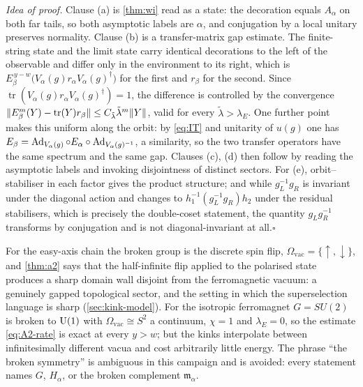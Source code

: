 \smallskip\noindent\textit{Idea of proof.}
Clause (a) is \cref{thm:wi} read as a state: the decoration equals $A_\alpha$ on
both far tails, so both asymptotic labels are $\alpha$, and conjugation by a
local unitary preserves normality.  Clause (b) is a transfer-matrix gap estimate.
The finite-string state and the limit state carry identical decorations to the
left of the observable and differ only in the environment to its right, which is
$E_\beta^{\,y-w}\bigl(V_\alpha(g)r_\alpha V_\alpha(g)^\dagger\bigr)$ for the
first and $r_\beta$ for the second.  Since
$\operatorname{tr}(V_\alpha(g)r_\alpha V_\alpha(g)^\dagger)=1$, the difference is
controlled by the convergence $\lVert E_\beta^m(Y)-\operatorname{tr}(Y)r_\beta\rVert\le
C_{\tilde\lambda}\tilde\lambda^m\lVert Y\rVert$, valid for every
$\tilde\lambda>\lambda_E$.  One further point makes this uniform along the orbit:
by \cref{eq:IT} and unitarity of $u(g)$ one has
$E_\beta=\operatorname{Ad}_{V_\alpha(g)}\circ E_\alpha\circ\operatorname{Ad}_{V_\alpha(g)^{-1}}$, a
similarity, so the two transfer operators have the same spectrum and the same
gap.  Clauses (c), (d) then follow by reading the asymptotic labels and invoking
disjointness of distinct sectors.  For (e), orbit--stabiliser in each factor gives
the product structure; and while $g_L^{-1}g_R$ is invariant under the diagonal
action and changes to $h_1^{-1}(g_L^{-1}g_R)h_2$ under the residual stabilisers,
which is precisely the double-coset statement, the quantity $g_Lg_R^{-1}$
transforms by conjugation and is not diagonal-invariant at all.\hfill$\square$

\begin{remark}
For the easy-axis chain the broken group is the discrete spin flip,
$\Omega_{\mathrm{vac}}=\{\uparrow,\downarrow\}$, and \cref{thm:a2} says that the
half-infinite flip applied to the polarised state produces a sharp domain wall
disjoint from the ferromagnetic vacuum: a genuinely gapped topological sector,
and the setting in which the superselection language is sharp
(\cref{sec:kink-model}).  For the isotropic ferromagnet $G=SU(2)$ is broken to
$\operatorname{U}(1)$ with $\Omega_{\mathrm{vac}}\cong S^2$ a continuum, $\chi=1$ and
$\lambda_E=0$, so the estimate \cref{eq:A2-rate} is exact at every $y>w$; but the
kinks interpolate between infinitesimally different vacua and cost arbitrarily
little energy.  The phrase ``the broken symmetry'' is ambiguous in this campaign
and is avoided: every statement names $G$, $H_\alpha$, or the broken complement
$\mathfrak{m}_\alpha$.
\end{remark}

